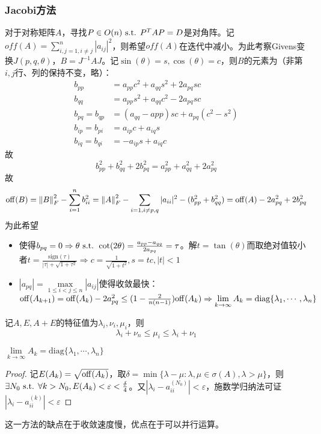 \documentclass{ctexart}
\begin{document}
\subsubsection{Jacobi方法}
对于对称矩阵$A$，寻找$P\in O(n)\text{ s.t. } P^TAP=D$是对角阵。记$off(A)=\sum_{i,j=1,i\neq j}^n|a_{ij}|^2$，则希望$off(A)$在迭代中减小。为此考察Givens变换$J(p,q,\theta)$，$B=J^{-1}AJ$。记$\sin(\theta)=s,\cos(\theta)=c$，则$B$的元素为（非第$i,j$行、列的保持不变，略）：
\begin{align*}
b_{pp}&=a_{pp}c^2+a_{qq}s^2+2a_{pq}sc\\
b_{qq}&=a_{pp}s^2+a_{qq}c^2-2a_{pq}sc\\
b_{pq}=b_{qp}&=(a_{qq}-a{pp})sc+a_{pq}(c^2-s^2)\\
b_{ip}=b_{pi}&=a_{ip}c+a_{iq}s\\
b_{iq}=b_{qi}&=-a_{ip}s+a_{iq}c
\end{align*}
故
\[b_{pp}^2+b_{qq}^2+2b_{pq}^2=a_{pp}^2+a_{qq}^2+2a_{pq}^2\]
故
\[\mathrm{off}(B)=\left\|B \right\|_F^2-\sum_{i=1}^n b_{ii}^2=\left\|A \right\|_F^2-\sum_{i=1,i\neq p,q}|a_{ii}|^2-(b_{pp}^2+b_{qq}^2)=\mathrm{off}(A)-2a_{pq}^2+2b_{pq}^2\]
为此希望
\begin{itemize}
\item 使得$b_{pq}=0\Rightarrow \theta\text{ s.t. } \cot(2\theta)=\frac{a_{pp}-a_{qq}}{2a_{pq}}=\tau$。解$t=\tan(\theta)$而取绝对值较小者$t=\frac{\mathrm{sign}(\tau)}{|\tau|+\sqrt{1+\tau^2}}\Rightarrow c=\frac{1}{\sqrt{1+t^2}},s=tc,|t|<1$

\item $|a_{pq}|=\max\limits_{1\leq i<j\leq n}|a_{ij}|$使得收敛最快：$\mathrm{off}(A_{k+1})=\mathrm{off}(A_k)-2a_{pq}^2\leq (1-\frac{2}{n(n-1)})\mathrm{off}(A_k)\Rightarrow \lim\limits_{k\to\infty} A_k=\mathrm{diag}\{\lambda_1,\cdots,\lambda_n\}$
\end{itemize}

\begin{Lemma}
记$A,E,A+E$的特征值为$\lambda_i,\nu_i,\mu_i$，则
\[\lambda_i+\nu_n\leq\mu_i\leq \lambda_i+\nu_1\]
\end{Lemma}

\begin{Thm}
$\lim\limits_{k\to\infty} A_k=\mathrm{diag}\{\lambda_1,\cdots,\lambda_n\}$
\end{Thm}

\begin{proof}
记$E(A_k)=\sqrt{\mathrm{off}(A_k)}$，取$\delta=\min\{\lambda-\mu:\lambda,\mu\in\sigma(A), \lambda>\mu\}$，则$\exists N_0\text{ s.t. } \forall k>N_0,E(A_k)<\varepsilon<\frac{\delta}{4}$。又$|\lambda_i-a^{(N_0)}_{ii}|<\varepsilon$，施数学归纳法可证$|\lambda_i-a^{(k)}_{ii}|<\varepsilon$
\end{proof}

这一方法的缺点在于收敛速度慢，优点在于可以并行运算。
\end{document}
